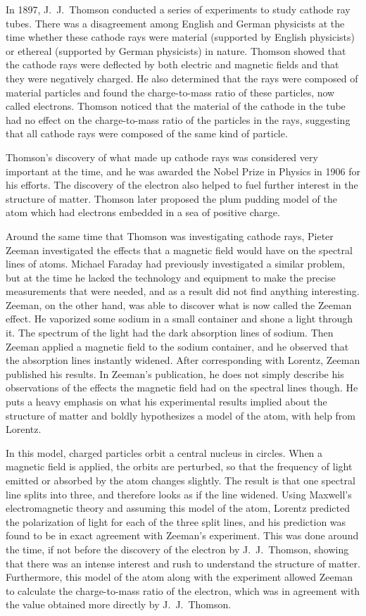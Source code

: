 \documentclass[12pt, oneside, letterpaper, fleqn]{article}
\begin{document}
In 1897, J.\ J.\ Thomson conducted a series of experiments to study
cathode ray tubes. There was a disagreement among English and German
physicists at the time whether these cathode rays were material
(supported by English physicists) or ethereal (supported by German
physicists) in nature. Thomson showed that the cathode rays were
deflected by both electric and magnetic fields and that they were
negatively charged. He also determined that the rays were composed of
material particles and found the charge-to-mass ratio of these
particles, now called electrons. Thomson noticed that the material of
the cathode in the tube had no effect on the charge-to-mass ratio of the
particles in the rays, suggesting that all cathode rays were composed of
the same kind of particle. 

Thomson's discovery of what made up cathode rays was considered very
important at the time, and he was awarded the Nobel Prize in Physics in
1906 for his efforts. The discovery of the electron also helped to fuel
further interest in the structure of matter. Thomson later proposed the
plum pudding model of the atom which had electrons embedded in a sea of
positive charge.

Around the same time that Thomson was investigating cathode rays, Pieter
Zeeman investigated the effects that a magnetic field would have on the
spectral lines of atoms. Michael Faraday had previously investigated a
similar problem, but at the time he lacked the technology and equipment
to make the precise measurements that were needed, and as a result did
not find anything interesting.  Zeeman, on the other hand, was able to
discover what is now called the Zeeman effect. He vaporized some sodium
in a small container and shone a light through it. The spectrum of the
light had the dark absorption lines of sodium. Then Zeeman applied a
magnetic field to the sodium container, and he observed that the
absorption lines instantly widened.  After corresponding with Lorentz,
Zeeman published his results.  In Zeeman's publication, he does not
simply describe his observations of the effects the magnetic field had
on the spectral lines though. He puts a heavy emphasis on what his
experimental results implied about the structure of matter and boldly
hypothesizes a model of the atom, with help from Lorentz.

In this model, charged particles orbit a central nucleus in circles.
When a magnetic field is applied, the orbits are perturbed, so that the
frequency of light emitted or absorbed by the atom changes slightly. The
result is that one spectral line splits into three, and therefore looks
as if the line widened. Using Maxwell's electromagnetic theory and
assuming this model of the atom, Lorentz predicted the polarization of
light for each of the three split lines, and his prediction was found to
be in exact agreement with Zeeman's experiment. This was done around the
time, if not before the discovery of the electron by J.\ J.\ Thomson,
showing that there was an intense interest and rush to understand the
structure of matter. Furthermore, this model of the atom along with the
experiment allowed Zeeman to calculate the charge-to-mass ratio of the
electron, which was in agreement with the value obtained more directly
by J.\ J.\ Thomson.
\end{document}
